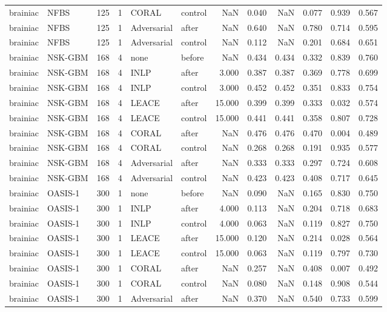 \begin{tabular}{llrrllrrrrrr}
brainiac & NFBS & 125 & 1 & CORAL & control & NaN & 0.040 & NaN & 0.077 & 0.939 & 0.567 \\
brainiac & NFBS & 125 & 1 & Adversarial & after & NaN & 0.640 & NaN & 0.780 & 0.714 & 0.595 \\
brainiac & NFBS & 125 & 1 & Adversarial & control & NaN & 0.112 & NaN & 0.201 & 0.684 & 0.651 \\
brainiac & NSK-GBM & 168 & 4 & none & before & NaN & 0.434 & 0.434 & 0.332 & 0.839 & 0.760 \\
brainiac & NSK-GBM & 168 & 4 & INLP & after & 3.000 & 0.387 & 0.387 & 0.369 & 0.778 & 0.699 \\
brainiac & NSK-GBM & 168 & 4 & INLP & control & 3.000 & 0.452 & 0.452 & 0.351 & 0.833 & 0.754 \\
brainiac & NSK-GBM & 168 & 4 & LEACE & after & 15.000 & 0.399 & 0.399 & 0.333 & 0.032 & 0.574 \\
brainiac & NSK-GBM & 168 & 4 & LEACE & control & 15.000 & 0.441 & 0.441 & 0.358 & 0.807 & 0.728 \\
brainiac & NSK-GBM & 168 & 4 & CORAL & after & NaN & 0.476 & 0.476 & 0.470 & 0.004 & 0.489 \\
brainiac & NSK-GBM & 168 & 4 & CORAL & control & NaN & 0.268 & 0.268 & 0.191 & 0.935 & 0.577 \\
brainiac & NSK-GBM & 168 & 4 & Adversarial & after & NaN & 0.333 & 0.333 & 0.297 & 0.724 & 0.608 \\
brainiac & NSK-GBM & 168 & 4 & Adversarial & control & NaN & 0.423 & 0.423 & 0.408 & 0.717 & 0.645 \\
brainiac & OASIS-1 & 300 & 1 & none & before & NaN & 0.090 & NaN & 0.165 & 0.830 & 0.750 \\
brainiac & OASIS-1 & 300 & 1 & INLP & after & 4.000 & 0.113 & NaN & 0.204 & 0.718 & 0.683 \\
brainiac & OASIS-1 & 300 & 1 & INLP & control & 4.000 & 0.063 & NaN & 0.119 & 0.827 & 0.750 \\
brainiac & OASIS-1 & 300 & 1 & LEACE & after & 15.000 & 0.120 & NaN & 0.214 & 0.028 & 0.564 \\
brainiac & OASIS-1 & 300 & 1 & LEACE & control & 15.000 & 0.063 & NaN & 0.119 & 0.797 & 0.730 \\
brainiac & OASIS-1 & 300 & 1 & CORAL & after & NaN & 0.257 & NaN & 0.408 & 0.007 & 0.492 \\
brainiac & OASIS-1 & 300 & 1 & CORAL & control & NaN & 0.080 & NaN & 0.148 & 0.908 & 0.544 \\
brainiac & OASIS-1 & 300 & 1 & Adversarial & after & NaN & 0.370 & NaN & 0.540 & 0.733 & 0.599 \\

\end{tabular}
